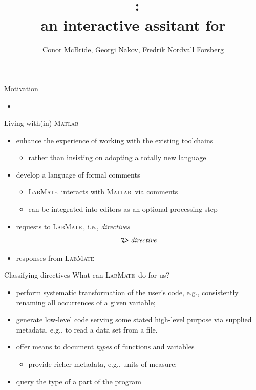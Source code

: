 \documentclass[handout]{beamer}
\title{\huge \lr\ :\\ an interactive assitant for \ma }
\author[McBride, Nakov, Nordvall Forsberg]{\small Conor McBride, \underline{Georgi Nakov}, Fredrik Nordvall Forsberg}
\institute[]{University of Strathclyde}
\newcommand{\pct}{\texttt{\symbol{37}}}
\newcommand{\dir}{\texttt{\symbol{62}}}
\newcommand{\lr}{\textsc{LabMate}}
\newcommand{\ma}{\textsc{Matlab}}
\begin{document}
\begin{frame}
  \titlepage
\end{frame}

\begin{frame}{Motivation}
\begin{itemize}
 \item %
\end{itemize}

\end{frame}

\begin{frame}{Living with(in) \ma}
\begin{itemize}
  \item enhance the experience of working with the existing toolchains
  \begin{itemize}
    \item rather than insisting on adopting a totally new language
  \end{itemize}
  \item develop a language of formal comments
  \begin{itemize}
    \item \lr\ interacts with \ma\ via comments
    \item can be integrated into editors as an optional processing step
  \end{itemize}
  \item requests to \lr\,, i.e., \emph{directives}
  \[\pct\dir\;\mathit{directive}\]
  \item responses from \lr
\end{itemize}
\end{frame}

\begin{frame}{Classifying directives}
  What can \lr\ do for us?
\begin{itemize}
  \item perform systematic transformation of the user's code, e.g., consistently renaming all occurrences of a given variable;
  \item generate low-level code serving some stated high-level purpose via supplied metadata, e.g., to read a data set from a file.
  \item offer means to document \emph{types} of functions and variables
  \begin{itemize}
    \item provide richer metadata, e.g., units of measure;
  \end{itemize}
  \item query the type of a part of the program
\end{itemize}
\end{frame}
\end{document}
